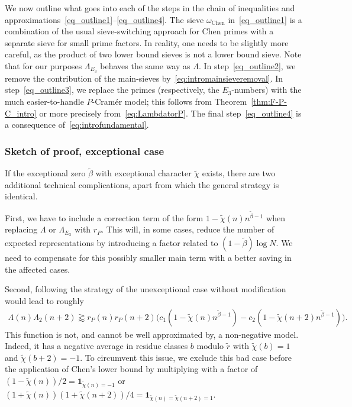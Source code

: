 \documentclass[12pt]{amsart}
\theoremstyle{definition}
\theoremstyle{remark}
\numberwithin{equation}{section}
\newcommand{\1}{\mathbf{1}}
\begin{document}
We now outline what goes into each of the steps in the chain of inequalities and approximations~\eqref{eq_outline1}--\eqref{eq_outline4}. The sieve $\omega_{\text{Chen}}$ in~\eqref{eq_outline1} is a combination of the usual sieve-switching approach for Chen primes with a separate sieve for small prime factors. In reality, one needs to be slightly more careful, as the product of two lower bound sieves is not a lower bound sieve. Note that for our purposes $\Lambda_{E_3}$ behaves the same way as $\Lambda$. In step~\eqref{eq_outline2}, we remove the contribution of the main-sieves by~\eqref{eq:intromainsieveremoval}. In step~\eqref{eq_outline3}, we replace the primes (respectively, the $E_3$-numbers) with the much easier-to-handle $P$-Cram\'er model; this follows from Theorem~\ref{thm:F-P-C_intro} or more precisely from~\eqref{eq:LambdatorP}. The final step~\eqref{eq_outline4} is a consequence of~\eqref{eq:introfundamental}.

\subsubsection{Sketch of proof, exceptional case}\label{subsec:introexc}
If the exceptional zero $\widetilde{\beta}$ with exceptional character $\widetilde{\chi}$ exists, there are two additional technical complications, apart from which the general strategy is identical.

First, we have to include a correction term of the form $1-\widetilde{\chi}(n)n^{\widetilde{\beta}-1}$ when replacing $\Lambda$ or $\Lambda_{E_3}$ with $r_P$. This will, in some cases, reduce the number of expected representations by introducing a factor related to $(1-\widetilde{\beta})\log N$. We need to compensate for this possibly smaller main term with a better saving in the affected cases. 
			
    Second, following the strategy of the unexceptional case without modification would lead to roughly
			\begin{align*}
				\Lambda(n)\Lambda_2(n+2)\gtrapprox  r_{P}(n)r_{P}(n+2)\bigl(c_1(1-\widetilde{\chi}(n)n^{\widetilde{\beta}-1})-c_2( 1-\widetilde{\chi}(n+2)n^{\widetilde{\beta}-1}) \bigr).
			\end{align*}
             This function is not, and cannot be well approximated by, a non-negative model. Indeed, it has a negative average in residue classes $b$ modulo $\widetilde{r}$ with $\widetilde{\chi}(b)=1$ and $\widetilde{\chi}(b+2)=-1$. To circumvent this issue, we exclude this bad case before the application of Chen's lower bound by multiplying with a factor of $(1-\widetilde{\chi}(n))/2=\1_{\widetilde{\chi}(n)=-1}$ or $(1+\widetilde{\chi}(n))(1+\widetilde{\chi}(n+2))/4=\1_{\widetilde{\chi}(n)=\widetilde{\chi}(n+2)=1}$.
\end{document}
